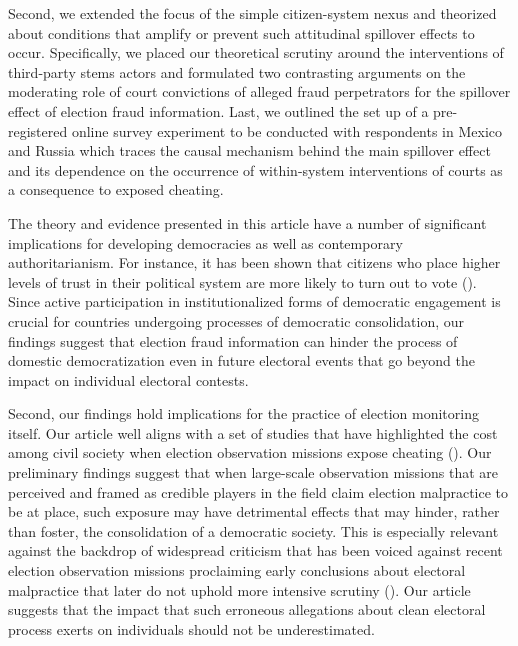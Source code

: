\documentclass[11pt, ngerman,english,a4]{article}
\begin{document}
Second, we extended the focus of the simple citizen-system nexus and theorized about conditions that amplify or prevent such attitudinal spillover effects to occur. Specifically, we placed our theoretical scrutiny around the interventions of third-party stems actors and formulated two contrasting arguments on the moderating role of court convictions of alleged fraud perpetrators for the spillover effect of election fraud information. Last, we outlined the set up of a pre-registered online survey experiment to be conducted with respondents in Mexico and Russia which traces the causal mechanism behind the main spillover effect and its dependence on the occurrence of within-system interventions of courts as a consequence to exposed cheating. 

The theory and evidence presented in this article have a number of significant implications for developing democracies as well as contemporary authoritarianism. For instance, it has been shown that citizens who place higher levels of trust in their political system are more likely to turn out to vote (\citealt{WANG2016291}). Since active participation in institutionalized forms of democratic engagement is crucial for countries undergoing processes of democratic consolidation, our findings suggest that election fraud information can hinder the process of domestic democratization even in future electoral events that go beyond the impact on individual electoral contests. 

Second, our findings hold implications for the practice of election monitoring itself. Our article well aligns with a set of studies that have highlighted the cost among civil society when election observation missions expose cheating (\citealt{Daxecker2012}). Our preliminary findings suggest that when large-scale observation missions that are perceived and framed as credible players in the field claim election malpractice to be at place, such exposure may have detrimental effects that may hinder, rather than foster, the consolidation of a democratic society. This is especially relevant against the backdrop of widespread criticism that has been voiced against recent election observation missions proclaiming early conclusions about electoral malpractice that later do not uphold more intensive scrutiny (\citealt{Idrobo2020}). Our article suggests that the impact that such erroneous allegations about clean electoral process exerts on individuals should not be underestimated. 

\singlespace
 

\end{document}
